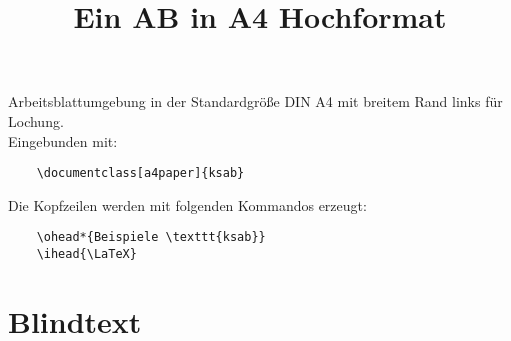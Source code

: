 \documentclass[a4paper]{ksab}
\title{Ein AB in A4 Hochformat}
\begin{document}
  \maketitle
  
  Arbeitsblattumgebung in der Standardgröße DIN A4 mit breitem Rand links für Lochung.\\
  Eingebunden mit:
  \begin{verbatim}
    \documentclass[a4paper]{ksab}
  \end{verbatim}
  
  Die Kopfzeilen werden mit folgenden Kommandos erzeugt:
  \begin{verbatim}
    \ohead*{Beispiele \texttt{ksab}}
    \ihead{\LaTeX}
  \end{verbatim}
  
  \section{Blindtext}
  
  \blindtext[4]
\end{document}
